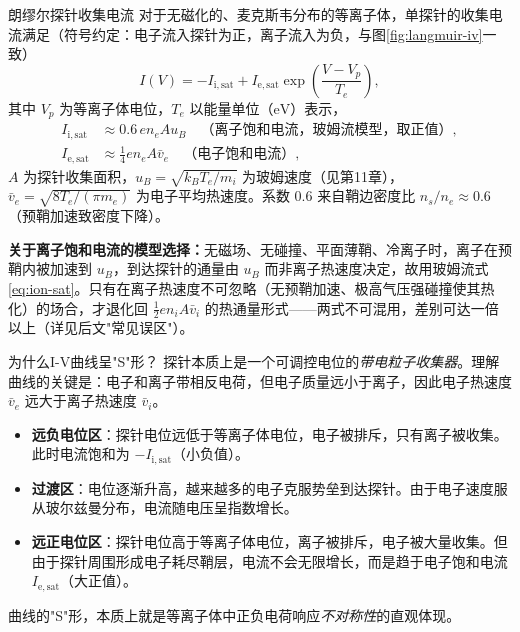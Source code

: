 \documentclass[12pt,a4paper,openany,oneside]{book}
\begin{document}
\begin{theorem}{朗缪尔探针收集电流}{}{}
对于无磁化的、麦克斯韦分布的等离子体，单探针的收集电流满足（符号约定：电子流入探针为正，离子流入为负，与图\ref{fig:langmuir-iv}一致）
\begin{equation}
I(V) = -I_{\mathrm{i,sat}} + I_{\mathrm{e,sat}}\exp\!\left(\frac{V - V_p}{T_e}\right),
\label{eq:langmuir-iv}
\end{equation}
其中 $V_p$ 为等离子体电位，$T_e$ 以能量单位（$\mathrm{eV}$）表示，
\begin{align}
I_{\mathrm{i,sat}} &\approx 0.6\, e n_e A u_B \quad \text{（离子饱和电流，玻姆流模型，取正值）},
\label{eq:ion-sat}\\
I_{\mathrm{e,sat}} &\approx \frac{1}{4} e n_e A \bar{v}_e \quad \text{（电子饱和电流）},
\label{eq:elec-sat}
\end{align}
$A$ 为探针收集面积，$u_B = \sqrt{k_BT_e/m_i}$ 为玻姆速度（见第11章），$\bar{v}_e = \sqrt{8 T_e / (\pi m_e)}$ 为电子平均热速度。系数 $0.6$ 来自鞘边密度比 $n_s/n_e\approx0.6$（预鞘加速致密度下降）。

\textbf{关于离子饱和电流的模型选择：}无磁场、无碰撞、平面薄鞘、冷离子时，离子在预鞘内被加速到 $u_B$，到达探针的通量由 $u_B$ 而非离子热速度决定，故用玻姆流式\eqref{eq:ion-sat}。只有在离子热速度不可忽略（无预鞘加速、极高气压强碰撞使其热化）的场合，才退化回 $\frac12 en_iA\bar v_i$ 的热通量形式——两式不可混用，差别可达一倍以上（详见后文"常见误区"）。
\end{theorem}

\begin{insight}{为什么I-V曲线呈"S"形？}{}
探针本质上是一个可调控电位的\emph{带电粒子收集器}。理解曲线的关键是：电子和离子带相反电荷，但电子质量远小于离子，因此电子热速度 $\bar{v}_e$ 远大于离子热速度 $\bar{v}_i$。

\begin{itemize}
    \item \textbf{远负电位区}：探针电位远低于等离子体电位，电子被排斥，只有离子被收集。此时电流饱和为 $-I_{\mathrm{i,sat}}$（小负值）。
    \item \textbf{过渡区}：电位逐渐升高，越来越多的电子克服势垒到达探针。由于电子速度服从玻尔兹曼分布，电流随电压呈指数增长。
    \item \textbf{远正电位区}：探针电位高于等离子体电位，离子被排斥，电子被大量收集。但由于探针周围形成电子耗尽鞘层，电流不会无限增长，而是趋于电子饱和电流 $I_{\mathrm{e,sat}}$（大正值）。
\end{itemize}

曲线的"S"形，本质上就是等离子体中正负电荷响应\emph{不对称性}的直观体现。
\end{insight}
\end{document}
